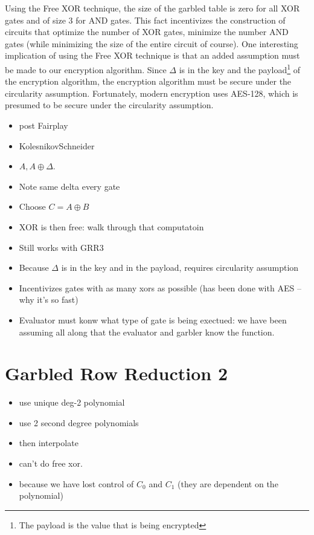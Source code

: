 \documentclass[12pt,twoside]{reedthesis}
\begin{document}
Using the Free XOR technique, the size of the garbled table is zero for all XOR gates and of size $3$ for AND gates.
This fact incentivizes the construction of circuits that optimize the number of XOR gates, minimize the number AND gates (while minimizing the size of the entire circuit of course).
One interesting implication of using the Free XOR technique is that an added assumption must be made to our encryption algorithm.
Since $\Delta$ is in the key and the payload\footnote{The payload is the value that is being encrypted} of the encryption algorithm, the encryption algorithm must be secure under the circularity assumption.
Fortunately, modern encryption uses AES-128, which is presumed to be secure under the circularity assumption.

\begin{itemize}
    \item post Fairplay
    \item KolesnikovSchneider
    \item $A,A \oplus \Delta$.
    \item Note same delta every gate
    \item Choose $C = A \oplus B$
    \item XOR is then free: walk through that computatoin
    \item Still works with GRR3
    \item Because $\Delta$ is in the key and in the payload, requires circularity assumption
    \item Incentivizes gates with as many xors as possible (has been done with AES -- why it's so fast)
    \item Evaluator must konw what type of gate is being exectued: we have been assuming all along that the evaluator and garbler know the function.
\end{itemize}

\section{Garbled Row Reduction 2}
\begin{itemize}
    \item use unique deg-2 polynomial
    \item use 2 second degree polynomials
    \item then interpolate
    \item can't do free xor.
    \item because we have lost control of $C_0$ and $C_1$ (they are dependent on the polynomial)
\end{itemize}
\end{document}
